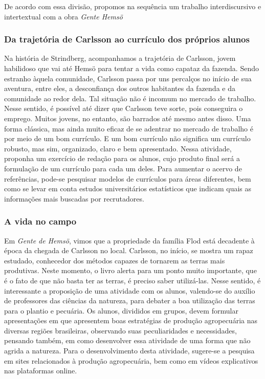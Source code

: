 \documentclass[12pt]{extarticle}
\begin{document}
De acordo com essa divisão, propomos na sequência um trabalho
interdiscursivo e intertextual com a obra \emph{Gente Hemsö}

\subsubsection{Da trajetória de Carlsson ao currículo dos próprios alunos}

Na história de Strindberg, acompanhamos a trajetória de Carlsson,
jovem habilidoso que vai até Hemsö para tentar a vida como capataz da
fazenda. Sendo estranho àquela comunidade, Carlsson passa por uns
percalços no início de sua aventura, entre eles, a desconfiança dos
outros habitantes da fazenda e da comunidade ao redor dela. Tal
situação não é incomum no mercado de trabalho. Nesse sentido, é
possível até dizer que Carlsson teve sorte, pois conseguira o emprego.
Muitos jovens, no entanto, são barrados até mesmo antes disso. Uma
forma clássica, mas ainda muito eficaz de se adentrar no mercado de
trabalho é por meio de um bom currículo. E um bom currículo não
significa um currículo robusto, mas sim, organizado, claro e bem
apresentado. Nessa atividade, proponha um exercício de redação para os
alunos, cujo produto final será a formulação de um currículo para cada
um deles. Para aumentar o acervo de referências, pode-se pesquisar
modelos de currículos para áreas diferentes, bem como se levar em
conta estudos universitários estatísticos que indicam quais as
informações mais buscadas por recrutadores.

\subsubsection{A vida no campo}


Em \emph{Gente de Hemsö}, vimos que a propriedade da família Flod está
decadente à época da chegada de Carlsson no local. Carlsson, no
início, se mostra um rapaz estudado, conhecedor dos métodos capazes de
tornarem as terras mais produtivas. Neste momento, o livro alerta para
um ponto muito importante, que é o fato de que não basta ter as
terras, é preciso saber utilizá-las. Nesse sentido, é interessante a
proposição de uma atividade com os alunos, valendo-se do auxílio de
professores das ciências da natureza, para debater a boa utilização
das terras para o plantio e pecuária. Os alunos, divididos em grupos,
devem formular apresentações em que apresentem boas estratégias de
produção agropecuária nas diversas regiões brasileiras, observando
suas peculiaridades e necessidades, pensando também, em como
desenvolver essa atividade de uma forma que não agrida a natureza.
Para o desenvolvimento desta atividade, sugere-se a pesquisa em sites
relacionados à produção agropecuária, bem como em vídeos explicativos
nas plataformas online.
\end{document}
